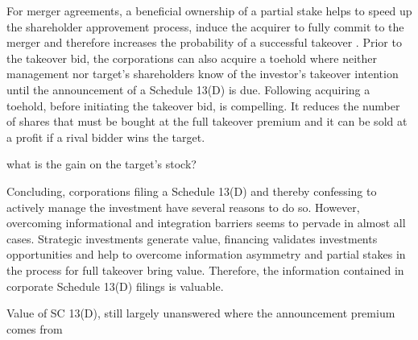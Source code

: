 \documentclass[12pt]{article}
\begin{document}
For merger agreements, a beneficial ownership of a partial stake helps to speed up the shareholder approvement process, induce the acquirer to fully commit to the merger and therefore increases the probability of a successful takeover \citep[p.19]{Betton2008}.
Prior to the takeover bid, the corporations can also acquire a toehold where neither management nor target's shareholders know of the investor's takeover intention until the announcement of a Schedule 13(D) is due. Following \citet[p.158]{Eckbo2009} acquiring a toehold, before initiating the takeover bid, is compelling. It reduces the number of shares that must be bought at the full takeover premium and it can be sold at a profit if a rival bidder wins the target.\\
\begin{center}
	what is the gain on the target's stock?
\end{center} 
Concluding, corporations filing a Schedule 13(D) and thereby confessing to actively manage the investment have several reasons to do so. However, overcoming informational and integration barriers seems to pervade in almost all cases. Strategic investments generate value, financing validates investments opportunities and help to overcome information asymmetry and partial stakes in the process for full takeover bring value. Therefore, the information contained in corporate Schedule 13(D) filings is valuable. 
\begin{center}
	Value of SC 13(D), still largely unanswered where the announcement premium comes from \citep[p.363]{Greenwood2009}
\end{center}
\end{document}

